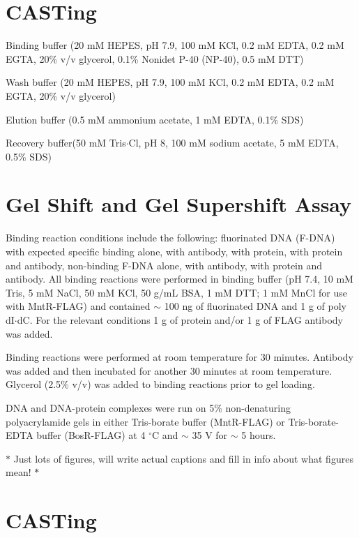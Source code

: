 \documentclass[12pt,twoside]{reedthesis}
\begin{document}
\section{CASTing}

Binding buffer (20 mM HEPES, pH 7.9, 100 mM KCl, 0.2 mM EDTA, 0.2 mM EGTA, 20\% v/v glycerol, 0.1\% Nonidet P-40 (NP-40), 0.5 mM DTT)

Wash buffer (20 mM HEPES, pH 7.9, 100 mM KCl, 0.2 mM EDTA, 0.2 mM EGTA, 20\% v/v glycerol)

Elution buffer (0.5 mM ammonium acetate, 1 mM EDTA, 0.1\% SDS)

Recovery buffer(50 mM Tris$\cdot$Cl, pH 8, 100 mM sodium acetate, 5 mM EDTA, 0.5\% SDS)




\clearpage


\section{Gel Shift and Gel Supershift Assay}

Binding reaction conditions include the following: fluorinated DNA (F-DNA) with expected specific binding alone, with antibody, with protein, with protein and antibody, non-binding F-DNA alone, with antibody, with protein and antibody. All binding reactions were performed in binding buffer (pH 7.4, 10 mM Tris, 5 mM NaCl, 50 mM KCl, 50 \micro g/mL BSA, 1 mM DTT; 1 mM MnCl for use with MntR-FLAG) and contained $\sim$ 100 ng of fluorinated DNA and 1 \micro g of poly dI$\cdot$dC. For the relevant conditions 1 \micro g of protein and/or 1 \micro g of FLAG antibody was added.

Binding reactions were performed at room temperature for 30 minutes. Antibody was added and then incubated for another 30 minutes at room temperature. Glycerol (2.5\% v/v) was added to binding reactions prior to gel loading. 

DNA and DNA-protein complexes were run on 5\% non-denaturing polyacrylamide gels in either Tris-borate buffer (MntR-FLAG) or Tris-borate-EDTA buffer (BosR-FLAG) at 4 $^\circ$C and $\sim$ 35 V for $\sim$ 5 hours. 
  
 

   
  
  $*$ Just lots of figures, will write actual captions and fill in info about what figures mean! $*$
  
    \section{CASTing} 
    
\end{document}
